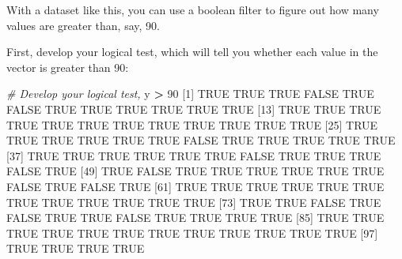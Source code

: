 \documentclass[
]{book}
\newenvironment{Shaded}{\begin{snugshade}}{\end{snugshade}}
\newcommand{\CommentTok}[1]{\textcolor[rgb]{0.56,0.35,0.01}{\textit{#1}}}
\newcommand{\ConstantTok}[1]{\textcolor[rgb]{0.56,0.35,0.01}{#1}}
\newcommand{\DecValTok}[1]{\textcolor[rgb]{0.00,0.00,0.81}{#1}}
\newcommand{\NormalTok}[1]{#1}
\newcommand{\SpecialCharTok}[1]{\textcolor[rgb]{0.81,0.36,0.00}{\textbf{#1}}}
\begin{document}
With a dataset like this, you can use a boolean filter to figure out how many values are greater than, say, 90.

First, develop your logical test, which will tell you whether each value in the vector is greater than 90:

\begin{Shaded}
\begin{Highlighting}[]
\CommentTok{\# Develop your logical test,}
\NormalTok{y }\SpecialCharTok{\textgreater{}} \DecValTok{90}
\NormalTok{  [}\DecValTok{1}\NormalTok{]  }\ConstantTok{TRUE}  \ConstantTok{TRUE}  \ConstantTok{TRUE} \ConstantTok{FALSE}  \ConstantTok{TRUE} \ConstantTok{FALSE}  \ConstantTok{TRUE}  \ConstantTok{TRUE}  \ConstantTok{TRUE}  \ConstantTok{TRUE}  \ConstantTok{TRUE}  \ConstantTok{TRUE}
\NormalTok{ [}\DecValTok{13}\NormalTok{]  }\ConstantTok{TRUE}  \ConstantTok{TRUE}  \ConstantTok{TRUE}  \ConstantTok{TRUE}  \ConstantTok{TRUE}  \ConstantTok{TRUE}  \ConstantTok{TRUE}  \ConstantTok{TRUE}  \ConstantTok{TRUE}  \ConstantTok{TRUE}  \ConstantTok{TRUE}  \ConstantTok{TRUE}
\NormalTok{ [}\DecValTok{25}\NormalTok{]  }\ConstantTok{TRUE}  \ConstantTok{TRUE}  \ConstantTok{TRUE}  \ConstantTok{TRUE}  \ConstantTok{TRUE}  \ConstantTok{TRUE} \ConstantTok{FALSE}  \ConstantTok{TRUE}  \ConstantTok{TRUE}  \ConstantTok{TRUE}  \ConstantTok{TRUE}  \ConstantTok{TRUE}
\NormalTok{ [}\DecValTok{37}\NormalTok{]  }\ConstantTok{TRUE}  \ConstantTok{TRUE}  \ConstantTok{TRUE}  \ConstantTok{TRUE}  \ConstantTok{TRUE}  \ConstantTok{TRUE} \ConstantTok{FALSE}  \ConstantTok{TRUE}  \ConstantTok{TRUE}  \ConstantTok{TRUE} \ConstantTok{FALSE}  \ConstantTok{TRUE}
\NormalTok{ [}\DecValTok{49}\NormalTok{]  }\ConstantTok{TRUE} \ConstantTok{FALSE}  \ConstantTok{TRUE}  \ConstantTok{TRUE}  \ConstantTok{TRUE}  \ConstantTok{TRUE}  \ConstantTok{TRUE}  \ConstantTok{TRUE} \ConstantTok{FALSE}  \ConstantTok{TRUE} \ConstantTok{FALSE}  \ConstantTok{TRUE}
\NormalTok{ [}\DecValTok{61}\NormalTok{]  }\ConstantTok{TRUE}  \ConstantTok{TRUE}  \ConstantTok{TRUE}  \ConstantTok{TRUE}  \ConstantTok{TRUE}  \ConstantTok{TRUE}  \ConstantTok{TRUE}  \ConstantTok{TRUE}  \ConstantTok{TRUE}  \ConstantTok{TRUE}  \ConstantTok{TRUE}  \ConstantTok{TRUE}
\NormalTok{ [}\DecValTok{73}\NormalTok{]  }\ConstantTok{TRUE}  \ConstantTok{TRUE} \ConstantTok{FALSE}  \ConstantTok{TRUE} \ConstantTok{FALSE}  \ConstantTok{TRUE}  \ConstantTok{TRUE} \ConstantTok{FALSE}  \ConstantTok{TRUE}  \ConstantTok{TRUE}  \ConstantTok{TRUE}  \ConstantTok{TRUE}
\NormalTok{ [}\DecValTok{85}\NormalTok{]  }\ConstantTok{TRUE}  \ConstantTok{TRUE}  \ConstantTok{TRUE}  \ConstantTok{TRUE}  \ConstantTok{TRUE}  \ConstantTok{TRUE}  \ConstantTok{TRUE}  \ConstantTok{TRUE}  \ConstantTok{TRUE}  \ConstantTok{TRUE}  \ConstantTok{TRUE}  \ConstantTok{TRUE}
\NormalTok{ [}\DecValTok{97}\NormalTok{]  }\ConstantTok{TRUE}  \ConstantTok{TRUE}  \ConstantTok{TRUE}  \ConstantTok{TRUE}
\end{Highlighting}
\end{Shaded}
\end{document}
